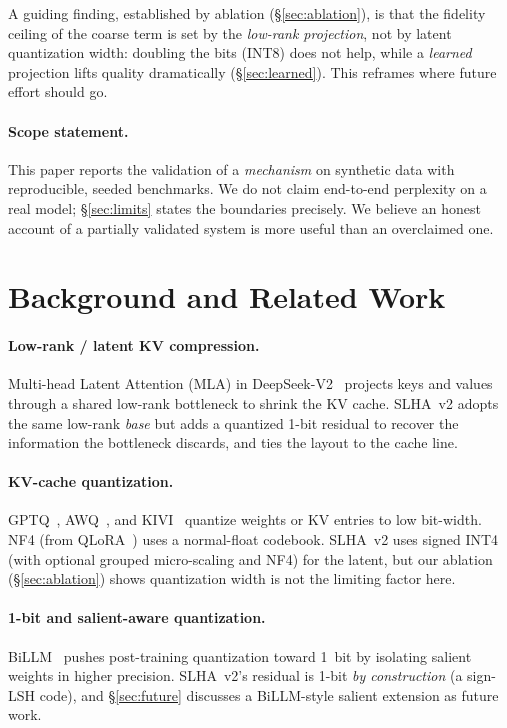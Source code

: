\documentclass[11pt]{article}
\theoremstyle{plain}
\theoremstyle{definition}
\begin{document}
A guiding finding, established by ablation (\S\ref{sec:ablation}), is
that the fidelity ceiling of the coarse term is set by the
\emph{low-rank projection}, not by latent quantization width: doubling
the bits (INT8) does not help, while a \emph{learned} projection lifts
quality dramatically (\S\ref{sec:learned}). This reframes where future
effort should go.

\paragraph{Scope statement.}
This paper reports the validation of a \emph{mechanism} on synthetic
data with reproducible, seeded benchmarks. We do not claim end-to-end
perplexity on a real model; \S\ref{sec:limits} states the boundaries
precisely. We believe an honest account of a partially validated system
is more useful than an overclaimed one.

\section{Background and Related Work}
\label{sec:related}

\paragraph{Low-rank / latent KV compression.}
Multi-head Latent Attention (MLA) in DeepSeek-V2~\cite{deepseekv2}
projects keys and values through a shared low-rank bottleneck to shrink
the KV cache. SLHA~v2 adopts the same low-rank \emph{base} but adds a
quantized 1-bit residual to recover the information the bottleneck
discards, and ties the layout to the cache line.

\paragraph{KV-cache quantization.}
GPTQ~\cite{gptq}, AWQ~\cite{awq}, and KIVI~\cite{kivi} quantize weights
or KV entries to low bit-width. NF4 (from QLoRA~\cite{qlora}) uses a
normal-float codebook. SLHA~v2 uses signed INT4 (with optional grouped
micro-scaling and NF4) for the latent, but our ablation
(\S\ref{sec:ablation}) shows quantization width is not the limiting
factor here.

\paragraph{1-bit and salient-aware quantization.}
BiLLM~\cite{billm} pushes post-training quantization toward 1~bit by
isolating salient weights in higher precision. SLHA~v2's residual is
1-bit \emph{by construction} (a sign-LSH code), and \S\ref{sec:future}
discusses a BiLLM-style salient extension as future work.
\end{document}
